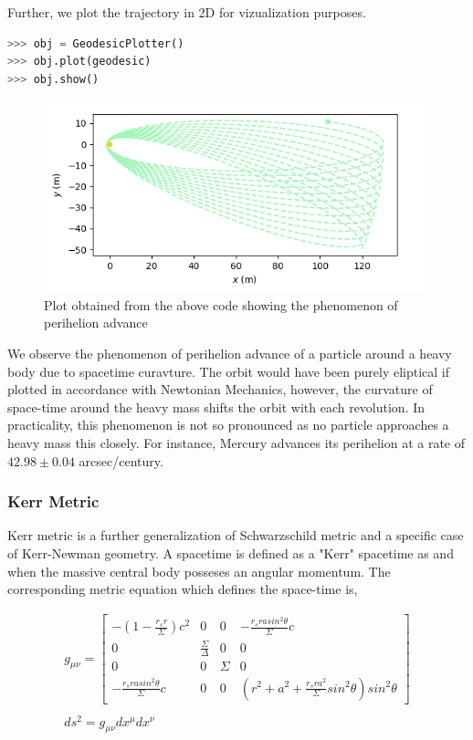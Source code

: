 \documentclass{aastex63}
\begin{document}
Further, we plot the trajectory in 2D for vizualization purposes.
\begin{lstlisting}[language=Python, caption=Plotting the trajectory]
>>> obj = GeodesicPlotter()
>>> obj.plot(geodesic)
>>> obj.show()
\end{lstlisting}

\begin{figure}[h]
	\centering
	\includegraphics[scale=0.7]{images/perihelion_cropped.png}
	\caption{Plot obtained from the above code showing the phenomenon of perihelion advance}
	\label{fig:schwarzschild}
\end{figure}

We observe the phenomenon of perihelion advance of a particle around a heavy body due to spacetime curavture. The orbit would have been purely eliptical if plotted in accordance with Newtonian Mechanics, however, the curvature of space-time around the heavy mass shifts the orbit with each revolution. In practicality, this phenomenon is not so pronounced as no particle approaches a heavy mass this closely. For instance, Mercury advances its perihelion at a rate of $42.98\pm 0.04$ arcsec/century.

\subsubsection{Kerr Metric}\label{subsubsec:kerr}
Kerr metric is a further generalization of Schwarzschild metric and a specific case of Kerr-Newman geometry. A spacetime is defined as a "Kerr" spacetime as and when the massive central body posseses an angular momentum. The corresponding metric equation which defines the space-time is,

\begin{gather}
g_{\mu \nu} = \begin{bmatrix} - (1 - \frac{r_s r}{\Sigma})c^2 & 0 & 0 & -\frac{r_s r a sin^2 \theta}{\Sigma}c \\ 0 & \frac{\Sigma}{\Delta} & 0 & 0 \\ 0 & 0 & \Sigma & 0 \\ -\frac{r_s r a sin^2 \theta}{\Sigma}c & 0 & 0 &  (r^2 + a^2 + \frac{r_s r a^2}{\Sigma}sin^2 \theta) sin^2 \theta \end{bmatrix} \\ 
\nonumber \\
ds^2 = g_{\mu \nu} dx^\mu dx^\nu
\end{gather}
\end{document}
